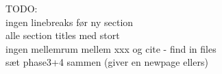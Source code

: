 TODO:\\
ingen linebreaks før ny section\\
alle section titles med stort\\
ingen mellemrum mellem xxx og cite - find in files\\
sæt phase3+4 sammen (giver en newpage ellers)
%
%
%
%
